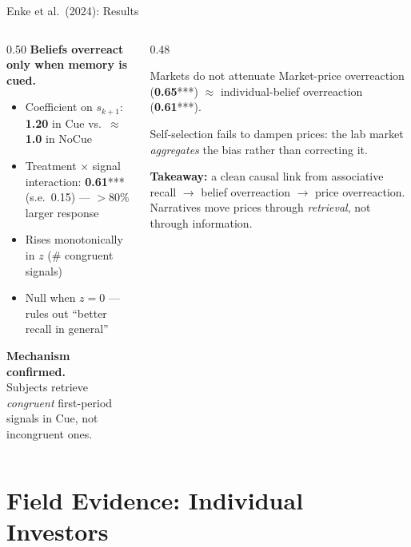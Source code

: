 \documentclass[aspectratio=169, 11pt]{beamer}
\begin{document}
\begin{frame}[shrink=5]{Enke et al.\ (2024): Results}
\begin{columns}[T]
\begin{column}{0.50\textwidth}
\textbf{Beliefs overreact only when memory is cued.}
\begin{itemize}
\item Coefficient on $s_{k+1}$: \textbf{1.20} in Cue vs.\ $\approx$\textbf{1.0} in NoCue
\item Treatment $\times$ signal interaction: \textbf{0.61}*** (s.e.\ 0.15) --- $>$80\% larger response
\item Rises monotonically in $z$ (\# congruent signals)
\item Null when $z=0$ --- rules out ``better recall in general''
\end{itemize}
\textbf{Mechanism confirmed.}\\
Subjects retrieve \emph{congruent} first-period signals in Cue, not incongruent ones.
\end{column}
\begin{column}{0.48\textwidth}
\begin{alertblock}{Markets do not attenuate}
Market-price overreaction (\textbf{0.65}***) $\approx$ individual-belief overreaction (\textbf{0.61}***).

Self-selection fails to dampen prices: the lab market \emph{aggregates} the bias rather than correcting it.
\end{alertblock}
\vspace{0.3em}
\footnotesize
\textbf{Takeaway:} a clean causal link from associative recall $\to$ belief overreaction $\to$ price overreaction. Narratives move prices through \emph{retrieval}, not through information.
\end{column}
\end{columns}
\end{frame}

\section{Field Evidence: Individual Investors}
\end{document}
